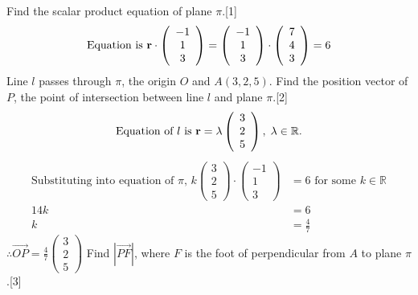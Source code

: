 \documentclass[12pt, a4 paper]{article}
\begin{document}
\begin{outline}[enumerate]
					\color{black}
					\2 Find the scalar product equation of plane $\pi $.\hfill[1]
					\color{blue}
					\[{\textrm{Equation is }}{\bf{r}} \cdot \left( {\begin{array}{*{20}{c}}{ - 1}\\1\\3\end{array}} \right) = \left( {\begin{array}{*{20}{c}}{ - 1}\\1\\3\end{array}} \right) \cdot \left( {\begin{array}{*{20}{c}}7\\4\\3\end{array}} \right) = 6\]
					\color{black}
					\2 Line ${l}$ passes through $\pi $, the origin $O$ and $A(3,2,5)$. Find the position vector of $P$, the point of intersection between line ${l}$ and plane $\pi $.\hfill[2]
					\color{blue}
					\[{\textrm{Equation of }}l{\textrm{ is }}{\bf{r}} = \lambda \left( {\begin{array}{*{20}{c}}3\\2\\5\end{array}} \right),\;\lambda  \in \mathbb{R}.\]
					\begin{align*}
						{\textrm{Substituting into equation of }}\pi {\textrm{, }}k\left( {\begin{array}{*{20}{c}}3 \\2\\5\end{array}} \right) \cdot \left( {\begin{array}{*{20}{c}}{ - 1}\\1\\3\end{array}} \right) &= 6{\textrm{ for some }}k \in \mathbb{R}\\14k &= 6\\k &= \frac{4}{7}
					\end{align*}
					$\therefore \overrightarrow {OP}  = \frac{4}{7}\left( {\begin{array}{*{20}{c}}3\\2\\5\end{array}} \right)$
					\color{black}
					\2 Find $\left| {\overrightarrow {PF} } \right|$, where $F$ is the foot of perpendicular from $A$ to plane $\pi $.\hfill[3]
					\color{blue}
					\begin{align*}

\end{align*}
\end{outline}
\end{document}
